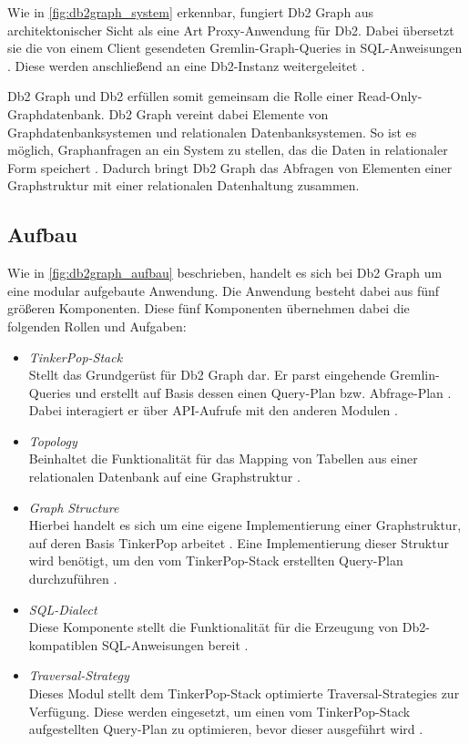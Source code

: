 Wie in \autoref{fig:db2graph_system} erkennbar, fungiert Db2 Graph aus architektonischer Sicht als eine Art Proxy-Anwendung für Db2. Dabei übersetzt sie die von einem Client gesendeten Gremlin-Graph-Queries in SQL-An\-wei\-sung\-en \cite{vldb_tian, sigmod_tian}. Diese werden anschließend an eine Db2-Instanz weitergeleitet \cite{vldb_tian, sigmod_tian}. 

Db2 Graph und Db2 erfüllen somit gemeinsam die Rolle einer Read-Only-Graph\-daten\-bank. Db2 Graph vereint dabei Elemente von Graphdatenbanksystemen und relationalen Datenbanksystemen. So ist es möglich, Graphanfragen an ein System zu stellen, das die Daten in relationaler Form speichert \cite{vldb_tian, sigmod_tian}. Dadurch bringt Db2 Graph das Abfragen von Elementen einer Graphstruktur mit einer relationalen Datenhaltung zusammen. 

\subsection{Aufbau}
Wie in \autoref{fig:db2graph_aufbau} beschrieben, handelt es sich bei Db2 Graph um eine modular aufgebaute Anwendung. Die Anwendung besteht dabei aus fünf größeren Komponenten. Diese fünf Komponenten übernehmen dabei die folgenden Rollen und Aufgaben: 

\begin{itemize}
    \item \textit{TinkerPop-Stack}\\Stellt das Grundgerüst für Db2 Graph dar. Er parst eingehende Gremlin-Queries und erstellt auf Basis dessen einen Query-Plan bzw. Abfrage-Plan \cite{vldb_tian}. Dabei interagiert er über API-Aufrufe mit den anderen Modulen \cite{vldb_tian}.
    \item \textit{Topology}\\Beinhaltet die Funktionalität für das Mapping von Tabellen aus einer relationalen Datenbank auf eine Graphstruktur \cite{vldb_tian, sigmod_tian}.
    \item \textit{Graph Structure}\\Hierbei handelt es sich um eine eigene Implementierung einer Graphstruktur, auf deren Basis TinkerPop arbeitet \cite{vldb_tian}. Eine Implementierung dieser Struktur wird benötigt, um den vom TinkerPop-Stack erstellten Query-Plan durchzuführen \cite{sigmod_tian}. 
    \item \textit{SQL-Dialect}\\Diese Komponente stellt die Funktionalität für die Erzeugung von Db2-kompatiblen SQL-Anweisungen bereit \cite{sigmod_tian}.
    \item \textit{Traversal-Strategy}\\Dieses Modul stellt dem TinkerPop-Stack optimierte Traversal-Strategies zur Verfügung. Diese werden eingesetzt, um einen vom TinkerPop-Stack aufgestellten Query-Plan zu optimieren, bevor dieser ausgeführt wird \cite{sigmod_tian}.  
\end{itemize}

